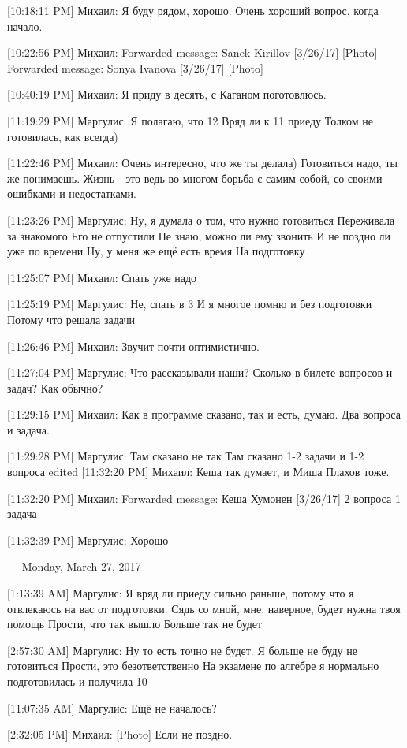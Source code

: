 \documentclass{article}
\begin{document}
[10:18:11 PM] Михаил:
Я буду рядом, хорошо.
 Очень хороший вопрос, когда начало.

[10:22:56 PM] Михаил:
Forwarded message: Sanek Kirillov [3/26/17] 
[Photo]
Forwarded message: Sonya Ivanova [3/26/17] 
[Photo]

[10:40:19 PM] Михаил:
Я приду в десять, с Каганом поготовлюсь.

[11:19:29 PM] Маргулис:
Я полагаю, что 12
 Вряд ли к 11 приеду
 Толком не готовилась, как всегда)

[11:22:46 PM] Михаил:
Очень интересно, что же ты делала) Готовиться надо, ты же понимаешь. Жизнь - это ведь во многом борьба с самим собой, со своими ошибками и недостатками.

[11:23:26 PM] Маргулис:
Ну, я думала о том, что нужно готовиться
 Переживала за знакомого
 Его не отпустили
 Не знаю, можно ли ему звонить
 И не поздно ли уже по времени
 Ну, у меня же ещё есть время
 На подготовку

[11:25:07 PM] Михаил:
Спать уже надо

[11:25:19 PM] Маргулис:
Не, спать в 3
 И я многое помню и без подготовки
 Потому что решала задачи

[11:26:46 PM] Михаил:
Звучит почти оптимистично.

[11:27:04 PM] Маргулис:
Что рассказывали наши? Сколько в билете вопросов и задач? Как обычно?

[11:29:15 PM] Михаил:
Как в программе сказано, так и есть, думаю. Два вопроса и задача.

[11:29:28 PM] Маргулис:
Там сказано не так
 Там сказано 1-2 задачи и 1-2 вопроса
edited 
[11:32:20 PM] Михаил:
Кеша так думает, и Миша Плахов тоже.

[11:32:20 PM] Михаил:
Forwarded message: Кеша Хумонен [3/26/17] 
2 вопроса
1 задача

[11:32:39 PM] Маргулис:
Хорошо

--- Monday, March 27, 2017 ---

[1:13:39 AM] Маргулис:
Я вряд ли приеду сильно раньше, потому что я отвлекаюсь на вас от подготовки. Сядь со мной, мне, наверное, будет нужна твоя помощь
 Прости, что так вышло
 Больше так не будет

[2:57:30 AM] Маргулис:
Ну то есть точно не будет.
 Я больше не буду не готовиться
 Прости, это безответственно
 На экзамене по алгебре я нормально подготовилась и получила 10

[11:07:35 AM] Маргулис:
Ещё не началось?

[2:32:05 PM] Михаил:
[Photo]
 Если не поздно.
\end{document}

